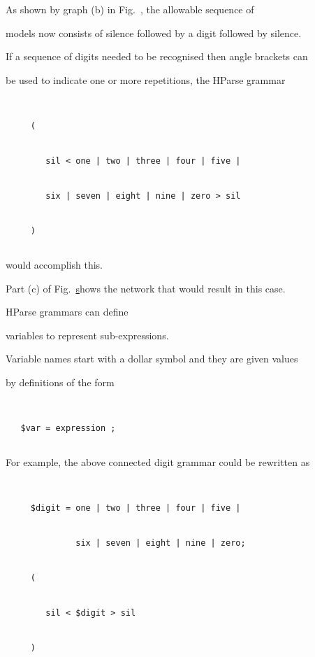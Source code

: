 As shown by graph (b) in Fig.~\href{f:digitnets}, the allowable sequence of


models now consists of silence followed by a digit followed by silence. 


If a sequence of digits needed to be recognised then angle brackets can


be used to indicate one or more repetitions, the HParse grammar


\begin{verbatim}


     (


        sil < one | two | three | four | five |


        six | seven | eight | nine | zero > sil


     )


\end{verbatim}


would accomplish this.


Part (c) of Fig.~\href{f:digitnets}


shows the network that would result in this case.










HParse grammars can define 


variables to represent sub-expressions.


Variable names start with a dollar symbol and they are given values


by definitions of the form


\begin{verbatim}


   $var = expression ;


\end{verbatim}


For example, the above connected digit grammar could be rewritten as


\begin{verbatim}


     $digit = one | two | three | four | five |


              six | seven | eight | nine | zero;


     (


        sil < $digit > sil


     )


\end{verbatim}


